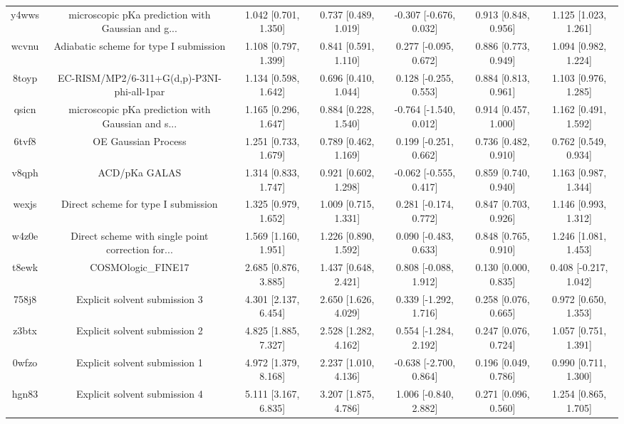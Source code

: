 \documentclass{article}
\begin{document}
\begin{center}
\begin{longtable}{|ccccccc|}
 y4wws &  microscopic pKa prediction with Gaussian and g... &  1.042 [0.701, 1.350] &  0.737 [0.489, 1.019] &  -0.307 [-0.676, 0.032] &  0.913 [0.848, 0.956] &   1.125 [1.023, 1.261] \\
 wcvnu &             Adiabatic scheme for type I submission &  1.108 [0.797, 1.399] &  0.841 [0.591, 1.110] &   0.277 [-0.095, 0.672] &  0.886 [0.773, 0.949] &   1.094 [0.982, 1.224] \\
 8toyp &         EC-RISM/MP2/6-311+G(d,p)-P3NI-phi-all-1par &  1.134 [0.598, 1.642] &  0.696 [0.410, 1.044] &   0.128 [-0.255, 0.553] &  0.884 [0.813, 0.961] &   1.103 [0.976, 1.285] \\
 qsicn &  microscopic pKa prediction with Gaussian and s... &  1.165 [0.296, 1.647] &  0.884 [0.228, 1.540] &  -0.764 [-1.540, 0.012] &  0.914 [0.457, 1.000] &   1.162 [0.491, 1.592] \\
 6tvf8 &                                OE Gaussian Process &  1.251 [0.733, 1.679] &  0.789 [0.462, 1.169] &   0.199 [-0.251, 0.662] &  0.736 [0.482, 0.910] &   0.762 [0.549, 0.934] \\
 v8qph &                                      ACD/pKa GALAS &  1.314 [0.833, 1.747] &  0.921 [0.602, 1.298] &  -0.062 [-0.555, 0.417] &  0.859 [0.740, 0.940] &   1.163 [0.987, 1.344] \\
 wexjs &                Direct scheme for type I submission &  1.325 [0.979, 1.652] &  1.009 [0.715, 1.331] &   0.281 [-0.174, 0.772] &  0.847 [0.703, 0.926] &   1.146 [0.993, 1.312] \\
 w4z0e &  Direct scheme with single point correction for... &  1.569 [1.160, 1.951] &  1.226 [0.890, 1.592] &   0.090 [-0.483, 0.633] &  0.848 [0.765, 0.910] &   1.246 [1.081, 1.453] \\
 t8ewk &                                 COSMOlogic\_FINE17 &  2.685 [0.876, 3.885] &  1.437 [0.648, 2.421] &   0.808 [-0.088, 1.912] &  0.130 [0.000, 0.835] &  0.408 [-0.217, 1.042] \\
 758j8 &                      Explicit solvent submission 3 &  4.301 [2.137, 6.454] &  2.650 [1.626, 4.029] &   0.339 [-1.292, 1.716] &  0.258 [0.076, 0.665] &   0.972 [0.650, 1.353] \\
 z3btx &                      Explicit solvent submission 2 &  4.825 [1.885, 7.327] &  2.528 [1.282, 4.162] &   0.554 [-1.284, 2.192] &  0.247 [0.076, 0.724] &   1.057 [0.751, 1.391] \\
 0wfzo &                      Explicit solvent submission 1 &  4.972 [1.379, 8.168] &  2.237 [1.010, 4.136] &  -0.638 [-2.700, 0.864] &  0.196 [0.049, 0.786] &   0.990 [0.711, 1.300] \\
 hgn83 &                      Explicit solvent submission 4 &  5.111 [3.167, 6.835] &  3.207 [1.875, 4.786] &   1.006 [-0.840, 2.882] &  0.271 [0.096, 0.560] &   1.254 [0.865, 1.705] \\
\end{longtable}
\end{center}
\end{document}
